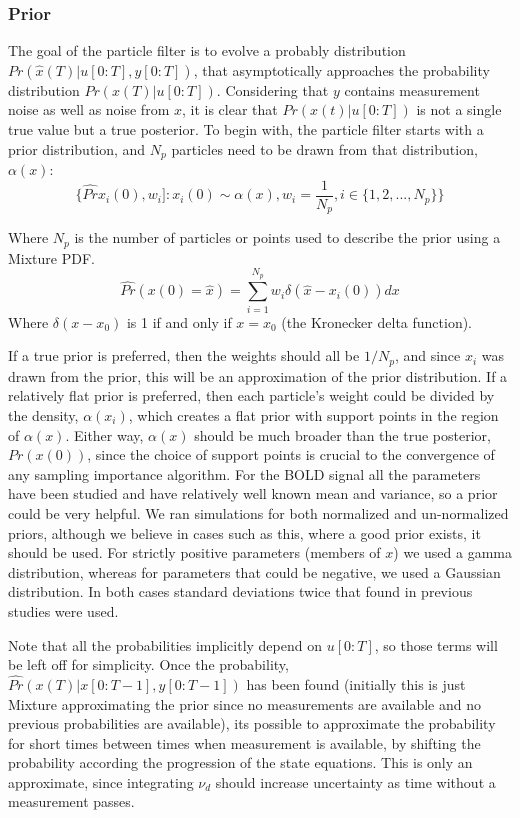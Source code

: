\documentclass{article}
\begin{document}
\subsubsection{Prior}

The goal of the particle filter is to evolve a probably distribution 
$Pr(\hat{x}(T) | u[0:T], y[0:T])$,
that asymptotically approaches the probability distribution $Pr(x(T) | u[0:T])$.
Considering that $y$ contains measurement noise as well as noise from $x$,
 it is clear that $Pr(x(t) | u[0:T])$ is not a single true value
but a true posterior. 
To begin with, the particle filter starts with a prior distribution, and $N_p$
particles need to be drawn from that distribution, $\alpha(x)$:
\begin{equation}
\{\hat{Pr}x_i(0),w_i] : x_i(0) \sim \alpha(x), w_i = \frac{1}{N_p}, i \in \{1, 2, ... , N_p\} \}
\end{equation}

Where $N_p$ is the number of particles or points used to describe the prior 
using a Mixture PDF. 
\begin{equation}
\hat{Pr}(x(0) = \hat{x}) = \sum_{i=1}^{N_p} w_i\delta(\hat{x} - x_i(0) ) dx
\end{equation}
Where $\delta(x-x_0)$ is 1 if and only if $x = x_0$ (the Kronecker delta function).

If a true prior is preferred, then the weights
should all be $1/N_p$, and since $x_i$ was drawn from the prior, this will
be an approximation of the prior distribution. If a relatively flat prior is 
preferred, then each particle's weight could be divided by the density, $\alpha(x_i)$,
which creates a flat prior with support points in the region of $\alpha(x)$. Either
way, $\alpha(x)$ should be much broader than the true posterior, $Pr(x(0))$, since the
choice of support points is crucial to the convergence of any sampling importance
algorithm. 
For the BOLD signal all the parameters have been studied and have relatively well
known mean and variance, so a prior could be very helpful. We ran simulations for
both normalized and un-normalized priors, although we believe in cases such as this,
where a good prior exists, it should be used. 
For strictly positive parameters (members of $x$) we used a gamma distribution,
whereas for parameters that could be negative, we used a Gaussian distribution. In
both cases standard deviations twice that found in previous studies were used.

Note that all the probabilities implicitly depend on $u[0:T]$, so those terms 
will be left off for simplicity.
Once the probability, $\hat{Pr}(x(T) | x[0:T-1], y[0:T-1])$ has been found
(initially this is just Mixture approximating the prior since no measurements are 
available and no previous probabilities are available), its possible to approximate
the probability for short times between times when measurement is available, by shifting
the probability according the progression of the state equations. This is only 
an approximate, since integrating $\nu_d$ should increase uncertainty as
time without a measurement passes. 
\end{document}
